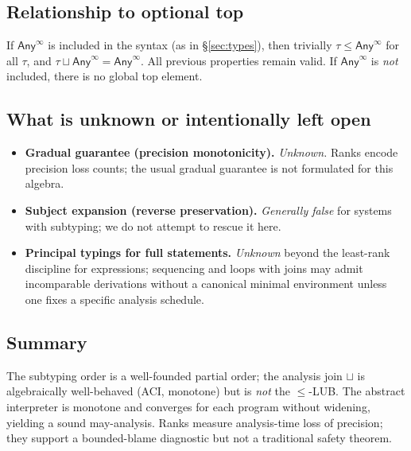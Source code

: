 \subsection{Relationship to optional top}
If $\mathsf{Any}^{\infty}$ is included in the syntax (as in \S\ref{sec:types}), then trivially $\tau\le \mathsf{Any}^{\infty}$ for all $\tau$, and
$\tau\sqcup \mathsf{Any}^{\infty}=\mathsf{Any}^{\infty}$.
All previous properties remain valid.
If $\mathsf{Any}^{\infty}$ is \emph{not} included, there is no global top element.

\subsection{What is unknown or intentionally left open}
\begin{itemize}
\item \textbf{Gradual guarantee (precision monotonicity).} \emph{Unknown.}
Ranks encode precision loss counts; the usual gradual guarantee is not formulated for this algebra.
\item \textbf{Subject expansion (reverse preservation).} \emph{Generally false} for systems with subtyping; we do not attempt to rescue it here.
\item \textbf{Principal typings for full statements.} \emph{Unknown} beyond the least-rank discipline for expressions; sequencing and loops with joins may admit incomparable derivations without a canonical minimal environment unless one fixes a specific analysis schedule.
\end{itemize}

\subsection{Summary}
The subtyping order is a well-founded partial order; the analysis join $\sqcup$ is algebraically well-behaved (ACI, monotone) but is \emph{not} the $\le$-LUB.
The abstract interpreter is monotone and converges for each program without widening, yielding a sound may-analysis.
Ranks measure analysis-time loss of precision; they support a bounded-blame diagnostic but not a traditional safety theorem.
